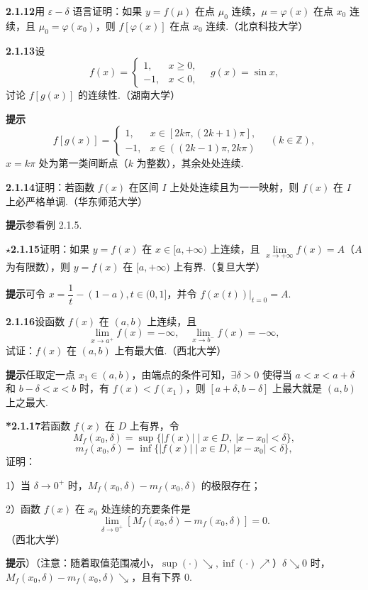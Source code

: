 \documentclass[UTF8,12pt,a4paper,fontset=fandol]{ctexart}
\begin{document}
\noindent\textbf{2.1.12}\quad 用 $\varepsilon-\delta$ 语言证明：如果 $y=f(\mu)$ 在点 $\mu_0$ 连续，$\mu=\varphi(x)$ 在点 $x_0$ 连续，且 $\mu_0=\varphi(x_0)$，则 $f[\varphi(x)]$ 在点 $x_0$ 连续.（北京科技大学）

\noindent\textbf{2.1.13}\quad 设
\[
  f(x)=
  \begin{cases}
    1, & x\ge0,\\
    -1, & x<0,
  \end{cases}
  \quad g(x)=\sin x,
\]
讨论 $f[g(x)]$ 的连续性.（湖南大学）

\noindent\textbf{提示}\quad
\[
  f[g(x)]=
  \begin{cases}
    1, & x\in[2k\pi,(2k+1)\pi],\\
    -1, & x\in((2k-1)\pi,2k\pi)
  \end{cases}
  \quad(k\in\mathbb{Z}),
\]
$x=k\pi$ 处为第一类间断点（$k$ 为整数），其余处处连续.

\noindent\textbf{2.1.14}\quad 证明：若函数 $f(x)$ 在区间 $I$ 上处处连续且为一一映射，则 $f(x)$ 在 $I$ 上必严格单调.（华东师范大学）

\noindent\textbf{提示}\quad 参看例 2.1.5.

\noindent\textbf{$\star$2.1.15}\quad 证明：如果 $y=f(x)$ 在 $x\in[a,+\infty)$ 上连续，且 $\lim\limits_{x\to+\infty}f(x)=A$（$A$ 为有限数），则 $y=f(x)$ 在 $[a,+\infty)$ 上有界.（复旦大学）

\noindent\textbf{提示}\quad 可令 $x=\dfrac1t-(1-a),t\in(0,1]$，并令 $\left.f(x(t))\right|_{t=0}=A$.

\noindent\textbf{2.1.16}\quad 设函数 $f(x)$ 在 $(a,b)$ 上连续，且
\[
  \lim_{x\to a^+}f(x)=-\infty,\quad
  \lim_{x\to b^-}f(x)=-\infty,
\]
试证：$f(x)$ 在 $(a,b)$ 上有最大值.（西北大学）

\noindent\textbf{提示}\quad 任取定一点 $x_1\in(a,b)$，由端点的条件可知，$\exists\delta>0$ 使得当 $a<x<a+\delta$ 和 $b-\delta<x<b$ 时，有 $f(x)<f(x_1)$，则 $[a+\delta,b-\delta]$ 上最大就是 $(a,b)$ 上之最大.

\noindent\textbf{*2.1.17}\quad 若函数 $f(x)$ 在 $D$ 上有界，令
\[
  M_f(x_0,\delta)=\sup\{|f(x)|\mid x\in D,\ |x-x_0|<\delta\},
\]
\[
  m_f(x_0,\delta)=\inf\{|f(x)|\mid x\in D,\ |x-x_0|<\delta\},
\]
证明：

1）当 $\delta\to0^+$ 时，$M_f(x_0,\delta)-m_f(x_0,\delta)$ 的极限存在；

2）函数 $f(x)$ 在 $x_0$ 处连续的充要条件是
\[
  \lim_{\delta\to0^+}[M_f(x_0,\delta)-m_f(x_0,\delta)]=0.
\]
（西北大学）

\noindent\textbf{提示}）（注意：随着取值范围减小，$\sup(\cdot)\searrow,\inf(\cdot)\nearrow$）$\delta\searrow0$ 时，$M_f(x_0,\delta)-m_f(x_0,\delta)\searrow$，且有下界 $0$.
\end{document}
